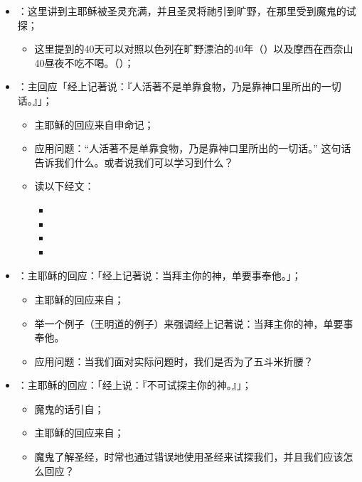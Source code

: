 \begin{itemize}
  \item {}：这里讲到主耶稣被圣灵充满，并且圣灵将祂引到旷野，在那里受到魔鬼的试探；
  \begin{itemize}
    \item 这里提到的40天可以对照以色列在旷野漂泊的40年（）以及摩西在西奈山40昼夜不吃不喝。（）；
  \end{itemize}
  \item {}：主回应「经上记著说：『人活著不是单靠食物，乃是靠神口里所出的一切话。』」；
  \begin{itemize}
    \item 主耶稣的回应来自申命记；
    \item 应用问题：“人活著不是单靠食物，乃是靠神口里所出的一切话。” 这句话告诉我们什么。或者说我们可以学习到什么？ 
    \item 读以下经文：
    \begin{itemize}
      \item {}
      \item {}
      \item {}
      \item {}
    \end{itemize}
  \end{itemize}
  \item {}：主耶稣的回应：「经上记著说：当拜主你的神，单要事奉他。」；
  \begin{itemize}
    \item 主耶稣的回应来自；
    \item 举一个例子（王明道的例子）来强调经上记著说：当拜主你的神，单要事奉他。
    \item 应用问题：当我们面对实际问题时，我们是否为了五斗米折腰？
  \end{itemize}
  \item {}：主耶稣的回应：「经上说：『不可试探主你的神。』」；
  \begin{itemize}
    \item 魔鬼的话引自；
    \item 主耶稣的回应来自；
    \item 魔鬼了解圣经，时常也通过错误地使用圣经来试探我们，并且我们应该怎么回应？
  \end{itemize}
\end{itemize}

